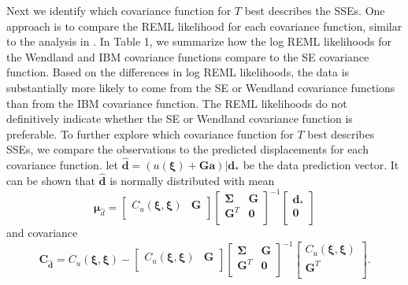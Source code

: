 \documentclass[10pt,letter]{article}
\begin{document}
Next we identify which covariance function for $T$ best describes the SSEs. One approach is to compare the REML likelihood for each covariance function, similar to the analysis in \citet{Langbein2004}. In Table 1, we summarize how the log REML likelihoods for the Wendland and IBM covariance functions compare to the SE covariance function.  Based on the differences in log REML likelihoods, the data is substantially more likely to come from the SE or Wendland covariance functions than from the IBM covariance function. The REML likelihoods do not definitively indicate whether the SE or Wendland covariance function is preferable. To further explore which covariance function for $T$ best describes SSEs, we compare the observations to the predicted displacements for each covariance function. let $\hat{\bm{d}} = \left(u(\bm{\xi}) + \bm{G}\bm{a}\right)|\bm{d}_*$ be the data prediction vector. It can be shown that $\hat{\bm{d}}$ is normally distributed with mean 
\begin{equation}\label{eq:DataPredMean}
\bm{\mu}_{\hat{d}} = \left[\begin{array}{cc}
                           C_u(\bm{\xi},\bm{\xi}) & \bm{G} \\
                           \end{array}\right]
                     \left[\begin{array}{cc}
                           \bm{\Sigma} & \bm{G} \\
                           \bm{G}^T  & \bm{0} \\
                           \end{array}\right]^{-1}
                     \left[\begin{array}{c}
                           \bm{d}_* \\
                           \bm{0} \\
                           \end{array}\right]
\end{equation}  
and covariance
\begin{equation}\label{eq:DataPredCov}
\bm{C}_{\hat{\bm{d}}} = C_u(\bm{\xi},\bm{\xi}) - 
                        \left[\begin{array}{cc}
                              C_u(\bm{\xi},\bm{\xi}) & \bm{G} \\
                              \end{array}\right]
                        \left[\begin{array}{cc}
                              \bm{\Sigma} & \bm{G} \\
                              \bm{G}^T  & \bm{0} \\
                              \end{array}\right]^{-1}
                        \left[\begin{array}{c}
                              C_u(\bm{\xi},\bm{\xi}) \\
                              \bm{G}^T \\
                              \end{array}\right].
\end{equation}
\end{document}

